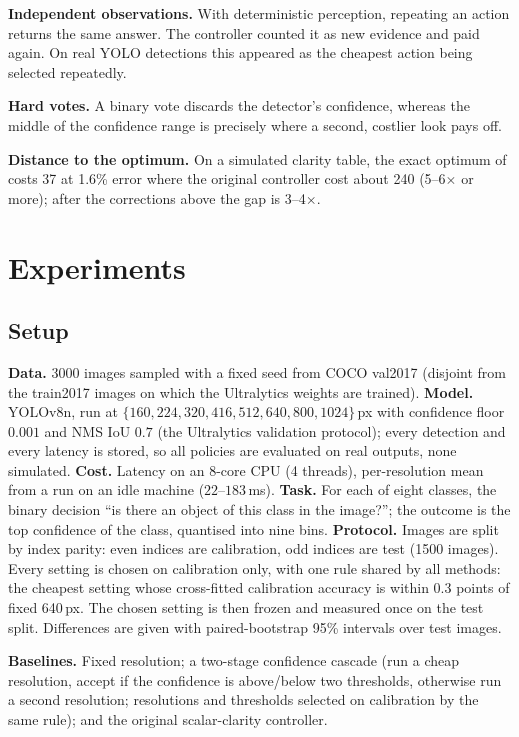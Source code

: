 \documentclass[11pt]{article}
\begin{document}
\textbf{Independent observations.} With deterministic perception, repeating an action returns the same
answer. The controller counted it as new evidence and paid again. On real YOLO detections this
appeared as the cheapest action being selected repeatedly.

\textbf{Hard votes.} A binary vote discards the detector's confidence, whereas the middle of the
confidence range is precisely where a second, costlier look pays off.

\textbf{Distance to the optimum.} On a simulated clarity table, the exact optimum of
 costs 37 at 1.6\% error where the original controller cost about 240 (5--6$\times$ or
more); after the corrections above the gap is 3--4$\times$.

\section{Experiments}
\label{sec:experiments}

\subsection{Setup}
\textbf{Data.} 3000 images sampled with a fixed seed from COCO val2017 (disjoint from the
train2017 images on which the Ultralytics weights are trained). \textbf{Model.} YOLOv8n, run at
$\{160,224,320,416,512,640,800,1024\}$\,px with confidence floor $0.001$ and NMS IoU $0.7$ (the
Ultralytics validation protocol); every detection and every latency is stored, so all policies are
evaluated on real outputs, none simulated. \textbf{Cost.} Latency on an 8-core CPU (4 threads),
per-resolution mean from a run on an idle machine ($22$--$183$\,ms). \textbf{Task.} For each of
eight classes, the binary decision ``is there an object of this class in the image?''; the outcome
is the top confidence of the class, quantised into nine bins. \textbf{Protocol.} Images are split
by index parity: even indices are calibration, odd indices are test (1500 images). Every setting is
chosen on calibration only, with one rule shared by all methods: the cheapest setting whose
cross-fitted calibration accuracy is within 0.3 points of fixed 640\,px. The chosen setting is then
frozen and measured once on the test split. Differences are given with paired-bootstrap 95\%
intervals over test images.

\textbf{Baselines.} Fixed resolution; a two-stage confidence cascade (run a cheap resolution, accept
if the confidence is above/below two thresholds, otherwise run a second resolution; resolutions and
thresholds selected on calibration by the same rule); and the original scalar-clarity controller.
\end{document}
